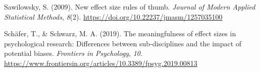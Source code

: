 \documentclass[
  man,
  colorlinks=true,linkcolor=blue,citecolor=blue,urlcolor=blue]{apa7}
\newlength{\cslhangindent}
\newlength{\cslentryspacingunit} %
\newenvironment{CSLReferences}[2] %
 {%
  \setlength{\parindent}{0pt}
  \ifodd #1
  \let\oldpar\par
  \def\par{\hangindent=\cslhangindent\oldpar}
  \fi
  \setlength{\parskip}{#2\cslentryspacingunit}
 }%
 {}
\begin{document}
\begin{CSLReferences}{1}{0}
\leavevmode{}%
Sawilowsky, S. (2009). New effect size rules of thumb. \emph{Journal of
Modern Applied Statistical Methods}, \emph{8}(2).
\url{https://doi.org/10.22237/jmasm/1257035100}

\leavevmode{}%
Schäfer, T., \& Schwarz, M. A. (2019). The meaningfulness of effect
sizes in psychological research: Differences between sub-disciplines and
the impact of potential biases. \emph{Frontiers in Psychology},
\emph{10}.
\url{https://www.frontiersin.org/articles/10.3389/fpsyg.2019.00813}

\end{CSLReferences}
\end{document}
